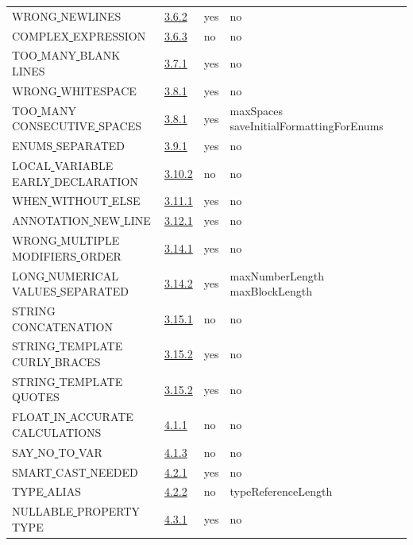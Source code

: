 \begin{longtable}{ |l|p{0.8cm}|p{0.8cm}| p{3cm} | }
WRONG\underline{ }NEWLINES & \hyperref[sec:3.6.2]{3.6.2} &  yes  &   no  \\
COMPLEX\underline{ }EXPRESSION & \hyperref[sec:3.6.3]{3.6.3} &  no  &   no  \\
TOO\underline{ }MANY\underline{ }BLANK\underline{ }LINES & \hyperref[sec:3.7.1]{3.7.1} &  yes  &   no  \\
WRONG\underline{ }WHITESPACE & \hyperref[sec:3.8.1]{3.8.1} &  yes  &   no  \\
TOO\underline{ }MANY\underline{ }CONSECUTIVE\underline{ }SPACES & \hyperref[sec:3.8.1]{3.8.1} &  yes  &   maxSpaces saveInitialFormattingForEnums  \\
ENUMS\underline{ }SEPARATED & \hyperref[sec:3.9.1]{3.9.1} &  yes  &   no  \\
LOCAL\underline{ }VARIABLE\underline{ }EARLY\underline{ }DECLARATION & \hyperref[sec:3.10.2]{3.10.2} &  no  &   no  \\
WHEN\underline{ }WITHOUT\underline{ }ELSE & \hyperref[sec:3.11.1]{3.11.1} &  yes  &   no  \\
ANNOTATION\underline{ }NEW\underline{ }LINE & \hyperref[sec:3.12.1]{3.12.1} &  yes  &   no  \\
WRONG\underline{ }MULTIPLE\underline{ }MODIFIERS\underline{ }ORDER & \hyperref[sec:3.14.1]{3.14.1} &  yes  &   no  \\
LONG\underline{ }NUMERICAL\underline{ }VALUES\underline{ }SEPARATED & \hyperref[sec:3.14.2]{3.14.2} &  yes  &   maxNumberLength maxBlockLength \\
STRING\underline{ }CONCATENATION & \hyperref[sec:3.15.1]{3.15.1} &  no  &   no  \\
STRING\underline{ }TEMPLATE\underline{ }CURLY\underline{ }BRACES & \hyperref[sec:3.15.2]{3.15.2} &  yes  &   no  \\
STRING\underline{ }TEMPLATE\underline{ }QUOTES & \hyperref[sec:3.15.2]{3.15.2} &  yes  &   no  \\
FLOAT\underline{ }IN\underline{ }ACCURATE\underline{ }CALCULATIONS & \hyperref[sec:4.1.1]{4.1.1} &  no  &   no  \\
SAY\underline{ }NO\underline{ }TO\underline{ }VAR & \hyperref[sec:4.1.3]{4.1.3} &  no  &   no  \\
SMART\underline{ }CAST\underline{ }NEEDED & \hyperref[sec:4.2.1]{4.2.1} &  yes  &   no  \\
TYPE\underline{ }ALIAS & \hyperref[sec:4.2.2]{4.2.2} &  no  &   typeReferenceLength        \\
NULLABLE\underline{ }PROPERTY\underline{ }TYPE & \hyperref[sec:4.3.1]{4.3.1} &  yes  &   no  \\

\end{longtable}
